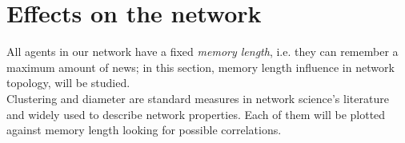 \section{Effects on the network}
All agents in our network have a fixed \textit{memory length}, i.e.
they can remember a maximum amount of news;
in this section, memory length influence in network topology,
will be studied.\\
Clustering and diameter are standard measures in network science's
literature and widely used to describe network properties.
Each of them will be plotted against memory length looking for
possible correlations.


